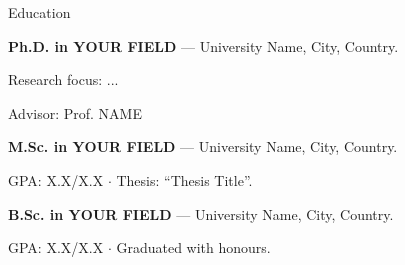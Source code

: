 \begin{rubric}{Education}

%
    \textbf{Ph.D. in YOUR FIELD} — University Name, City, Country.
    \par Research focus: ...
    \par Advisor: Prof. NAME

%
    \textbf{M.Sc. in YOUR FIELD} — University Name, City, Country.
    \par GPA: X.X/X.X $\cdot$ Thesis: ``Thesis Title''.

%
    \textbf{B.Sc. in YOUR FIELD} — University Name, City, Country.
    \par GPA: X.X/X.X $\cdot$ Graduated with honours.

\end{rubric}
